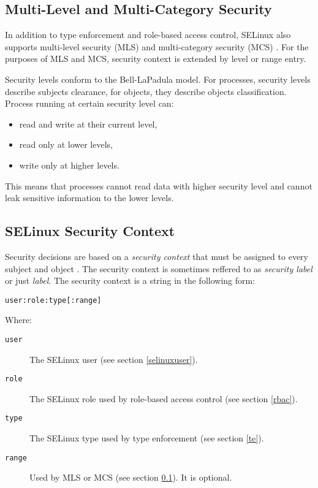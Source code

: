 \subsection{Multi-Level and Multi-Category Security}
\label{mls}

In addition to type enforcement and role-based access control, SELinux also
supports multi-level security (MLS) and multi-category security (MCS)
\cite[pp.~48--53]{tsn}. For the purposes of MLS and MCS, security context is
extended by level or range entry.

Security levels conform to the Bell-LaPadula model. For processes, security
levels describe subjects clearance, for objects, they describe objects
classification. Process running at certain security level can:
\begin{itemize}
    \item read and write at their current level,
    \item read only at lower levels,
    \item write only at higher levels.
\end{itemize}
This means that processes cannot read data with higher security level and
cannot leak sensitive information to the lower levels.

\subsection{SELinux Security Context}
\label{context}

Security decisions are based on a \emph{security context} that must be assigned
to every subject and object \cite[pp.~27--28]{tsn}. The security context is
sometimes reffered to as \emph{security label} or just \emph{label}.  The
security context is a string in the following form:
\begin{lstlisting}
user:role:type[:range]
\end{lstlisting}
Where:
\begin{description}
    \item [\texttt{user}] The SELinux user (see section \ref{selinuxuser}).
    \item [\texttt{role}] The SELinux role used by role-based access control
        (see section \ref{rbac}).
    \item [\texttt{type}] The SELinux type used by type enforcement (see section
        \ref{te}).
    \item [\texttt{range}] Used by MLS or MCS (see section \ref{mls}). It is optional.
\end{description}

